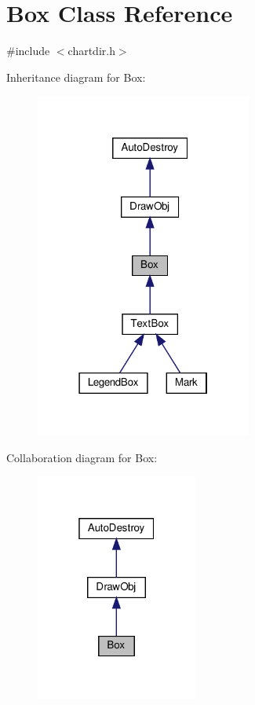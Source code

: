 \hypertarget{class_box}{}\section{Box Class Reference}
\label{class_box}


{\ttfamily \#include $<$chartdir.\+h$>$}



Inheritance diagram for Box\+:
\nopagebreak
\begin{figure}[H]
\begin{center}
\leavevmode
\includegraphics[width=202pt]{class_box__inherit__graph}
\end{center}
\end{figure}


Collaboration diagram for Box\+:
\nopagebreak
\begin{figure}[H]
\begin{center}
\leavevmode
\includegraphics[width=151pt]{class_box__coll__graph}
\end{center}
\end{figure}
